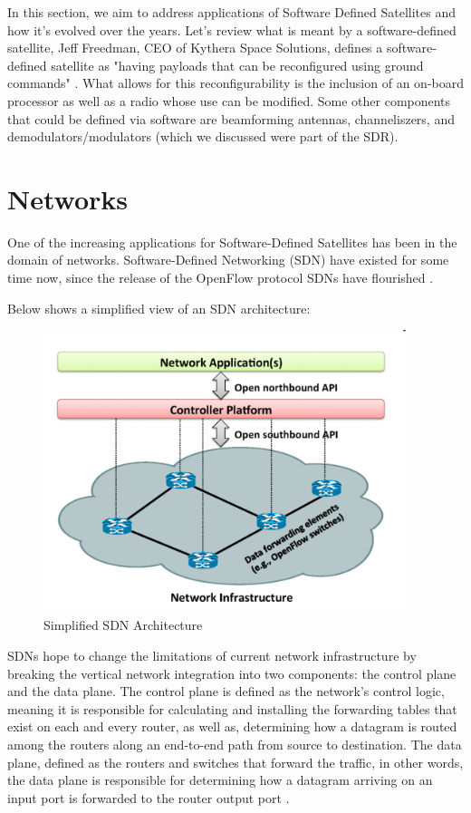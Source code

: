 \documentclass[../main.tex]{subfiles}
\begin{document}
In this section, we aim to address applications of Software Defined Satellites and how it's evolved over the years. Let's review what is meant by a software-defined satellite, Jeff Freedman, CEO of Kythera Space Solutions, defines a software-defined satellite as "having payloads that can be reconfigured using ground commands" \cite{podcast}. What allows for this reconfigurability is the inclusion of an on-board processor as well as a radio whose use can be modified. Some other components that could be defined via software are beamforming antennas, channeliszers, and demodulators/modulators (which we discussed were part of the SDR). \cite{podcast}

\section{Networks}
One of the increasing applications for Software-Defined Satellites has been in the domain of networks. Software-Defined Networking (SDN) have existed for some time now, since the release of the OpenFlow protocol SDNs have flourished \cite{sdn_architecture}.

Below shows a simplified view of an SDN architecture:

\begin{figure}[H]
    \centering
    \includegraphics[width=300pt]{images/sdn_architecture.PNG}
    \caption{Simplified SDN Architecture}
    \label{fig:sdn}
\end{figure}

SDNs hope to change the limitations of current network infrastructure by breaking the vertical network integration into two components: the control plane and the data plane. The control plane is defined as the network's control logic, meaning it is responsible for calculating and installing the forwarding tables that exist on each and every router, as well as, determining how a datagram is routed among the routers along an end-to-end path from source to destination. The data plane, defined as the routers and switches that forward the traffic, in other words, the data plane is responsible for determining how a datagram arriving on an input port is forwarded to the router output port \cite{sdsn}. 
\end{document}
